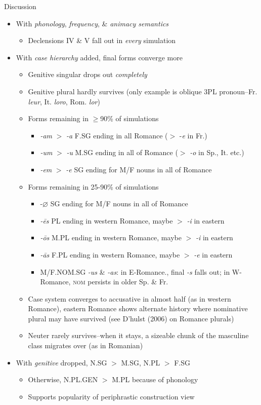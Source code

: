\documentclass[final]{beamer}
\newlength{\onecolwid}
\newcommand{\bit}[0]{\begin{itemize}}
\newcommand{\eit}[0]{\end{itemize}}
\begin{document}
\begin{frame}[t]
\begin{columns}[t]
\begin{column}{\onecolwid}

\begin{alertblock}{Discussion}

\small
\bit
	\item With \textit{phonology}, \textit{frequency}, \& \textit{animacy semantics}
	\bit
		\item Declensions IV \& V fall out in \textit{every} simulation
	\eit
	\item With \textit{case hierarchy} added, final forms converge more
	\bit
		\item Genitive singular drops out \textit{completely}
		\item Genitive plural hardly survives (only example is oblique 3PL pronoun--Fr. \textit{leur}, It. \textit{loro}, Rom. \textit{lor})
		\item Forms remaining in $\geq$90\% of simulations
		\bit
			\item \textit{-am} $>$ \textit{-a} F.SG ending in all Romance ($>$ -\textit{e} in Fr.)
			\item \textit{-um} $>$ \textit{-u} M.SG ending in all of Romance ($>$ \textit{-o} in Sp., It. etc.)
			\item \textit{-em} $>$ \textit{-e} SG ending for M/F nouns in all of Romance
		\eit
		\item Forms remaining in 25-90\% of simulations
		\bit
			\item -$\varnothing$ SG ending for M/F nouns in all of Romance
			\item \textit{-\=es} PL ending in western Romance, maybe $>$ \textit{-i} in eastern
			\item \textit{-\=os} M.PL ending in western Romance, maybe $>$ \textit{-i} in eastern
			\item \textit{-\=as} F.PL ending in western Romance, maybe $>$ \textit{-e} in eastern
			\item M/F.NOM.SG \textit{-us} \& \textit{-as}: in E-Romance., final \textit{-s} falls out; in W-Romance, \textsc{nom} persists in older Sp. \& Fr.
		\eit
		\item Case system converges to accusative in almost half (as in western Romance), eastern Romance shows alternate history where nominative plural may have survived (see D'hulst (2006) on Romance plurals)
		\item Neuter rarely survives--when it stays, a sizeable chunk of the masculine class migrates over (as in Romanian)
	\eit
	\item With \textit{genitive} dropped, N.SG $>$ M.SG, N.PL $>$ F.SG
	\bit
		\item Otherwise, N.PL.GEN $>$ M.PL because of phonology
		\item Supports popularity of periphrastic construction view
	\eit
\eit


\end{alertblock}
\end{column}
\end{columns}
\end{frame}
\end{document}

